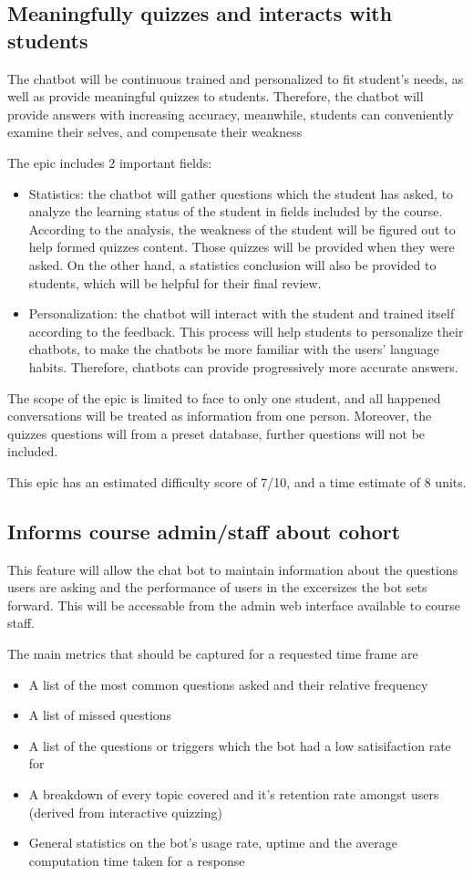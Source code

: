 \documentclass{article}
\begin{document}
\subsection{Meaningfully quizzes and interacts with students}
The chatbot will be continuous trained and personalized to fit student’s needs, as well as provide meaningful quizzes to students. Therefore, the chatbot will provide answers with increasing accuracy, meanwhile, students can conveniently examine their selves, and compensate their weakness

The epic includes 2 important fields:
\begin{itemize}
  \item Statistics: the chatbot will gather questions which the student has asked, to analyze the learning status of the student in fields included by the course. According to the analysis, the weakness of the student will be figured out to help formed quizzes content. Those quizzes will be provided when they were asked. On the other hand, a statistics conclusion will also be provided to students, which will be helpful for their final review.
  \item Personalization: the chatbot will interact with the student and trained itself according to the feedback. This process will help students to personalize their chatbots, to make the chatbots be more familiar with the users’ language habits. Therefore, chatbots can provide progressively more accurate answers. 
\end{itemize}

The scope of the epic is limited to face to only one student, and all happened conversations will be treated as information from one person. Moreover, the quizzes questions will from a preset database, further questions will not be included.

This epic has an estimated difficulty score of 7/10, and a time estimate of 8 units.


\subsection{Informs course admin/staff about cohort}

This feature will allow the chat bot to maintain information about the questions users are asking and the performance of users in the excersizes the bot sets forward. This will be accessable from the admin web interface available to course staff.

The main metrics that should be captured for a requested time frame are
\begin{itemize}
  \item A list of the most common questions asked and their relative frequency
  \item A list of missed questions
  \item A list of the questions or triggers which the bot had a low satisifaction rate for
  \item A breakdown of every topic covered and it's retention rate amongst users (derived from interactive quizzing)
  \item General statistics on the bot's usage rate, uptime and the average computation time taken for a response
\end{itemize}
\end{document}
